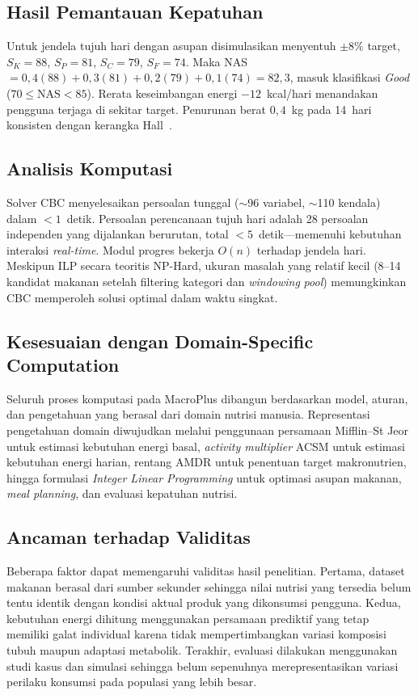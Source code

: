 \documentclass[conference]{IEEEtran}
\begin{document}
\subsection{Hasil Pemantauan Kepatuhan}
Untuk jendela tujuh hari dengan asupan disimulasikan menyentuh $\pm 8\%$ target, $S_K{=}88$, $S_P{=}81$, $S_C{=}79$, $S_F{=}74$. Maka NAS $= 0{,}4(88)+0{,}3(81)+0{,}2(79)+0{,}1(74) = 82{,}3$, masuk klasifikasi \textit{Good} ($70\le\text{NAS}<85$). Rerata keseimbangan energi $-12$~kcal/hari menandakan pengguna terjaga di sekitar target. Penurunan berat $0{,}4$~kg pada 14~hari konsisten dengan kerangka Hall~\cite{hall2011quantification}.

\subsection{Analisis Komputasi}
Solver CBC menyelesaikan persoalan tunggal ($\sim$96 variabel, $\sim$110 kendala) dalam $<1$~detik. Persoalan perencanaan tujuh hari adalah 28 persoalan independen yang dijalankan berurutan, total $<5$~detik---memenuhi kebutuhan interaksi \textit{real-time}. Modul progres bekerja $O(n)$ terhadap jendela hari. Meskipun ILP secara teoritis NP-Hard, ukuran masalah yang relatif kecil (8--14 kandidat makanan setelah filtering kategori dan \textit{windowing} \textit{pool}) memungkinkan CBC memperoleh solusi optimal dalam waktu singkat.

\subsection{Kesesuaian dengan Domain-Specific Computation}

Seluruh proses komputasi pada MacroPlus dibangun berdasarkan model, aturan, dan pengetahuan yang berasal dari domain nutrisi manusia. Representasi pengetahuan domain diwujudkan melalui penggunaan persamaan Mifflin--St Jeor untuk estimasi kebutuhan energi basal, \textit{activity multiplier} ACSM untuk estimasi kebutuhan energi harian, rentang AMDR untuk penentuan target makronutrien, hingga formulasi \textit{Integer Linear Programming} untuk optimasi asupan makanan, \textit{meal planning}, dan evaluasi kepatuhan nutrisi.

\subsection{Ancaman terhadap Validitas}
Beberapa faktor dapat memengaruhi validitas hasil penelitian.
Pertama, dataset makanan berasal dari sumber sekunder sehingga nilai
nutrisi yang tersedia belum tentu identik dengan kondisi aktual
produk yang dikonsumsi pengguna. Kedua, kebutuhan energi dihitung menggunakan persamaan prediktif yang
tetap memiliki galat individual karena tidak mempertimbangkan variasi
komposisi tubuh maupun adaptasi metabolik. Terakhir, evaluasi dilakukan menggunakan studi kasus dan simulasi sehingga
belum sepenuhnya merepresentasikan variasi perilaku konsumsi pada
populasi yang lebih besar.
\end{document}
